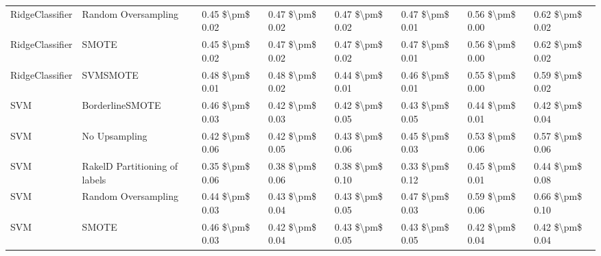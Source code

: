 \begin{tabular}{llllllll}
                RidgeClassifier &           Random Oversampling & 0.45 \$\textbackslash pm\$ 0.02 &           0.47 \$\textbackslash pm\$ 0.02 &       0.47 \$\textbackslash pm\$ 0.02 &        0.47 \$\textbackslash pm\$ 0.01 &                         0.56 \$\textbackslash pm\$ 0.00 &     0.62 \$\textbackslash pm\$ 0.02 \\
                RidgeClassifier &                         SMOTE & 0.45 \$\textbackslash pm\$ 0.02 &           0.47 \$\textbackslash pm\$ 0.02 &       0.47 \$\textbackslash pm\$ 0.02 &        0.47 \$\textbackslash pm\$ 0.01 &                         0.56 \$\textbackslash pm\$ 0.00 &     0.62 \$\textbackslash pm\$ 0.02 \\
                RidgeClassifier &                      SVMSMOTE & 0.48 \$\textbackslash pm\$ 0.01 &           0.48 \$\textbackslash pm\$ 0.02 &       0.44 \$\textbackslash pm\$ 0.01 &        0.46 \$\textbackslash pm\$ 0.01 &                         0.55 \$\textbackslash pm\$ 0.00 &     0.59 \$\textbackslash pm\$ 0.02 \\
                            SVM &               BorderlineSMOTE & 0.46 \$\textbackslash pm\$ 0.03 &           0.42 \$\textbackslash pm\$ 0.03 &       0.42 \$\textbackslash pm\$ 0.05 &        0.43 \$\textbackslash pm\$ 0.05 &                         0.44 \$\textbackslash pm\$ 0.01 &     0.42 \$\textbackslash pm\$ 0.04 \\
                            SVM &                 No Upsampling & 0.42 \$\textbackslash pm\$ 0.06 &           0.42 \$\textbackslash pm\$ 0.05 &       0.43 \$\textbackslash pm\$ 0.06 &        0.45 \$\textbackslash pm\$ 0.03 &                         0.53 \$\textbackslash pm\$ 0.06 &     0.57 \$\textbackslash pm\$ 0.06 \\
                            SVM & RakelD Partitioning of labels & 0.35 \$\textbackslash pm\$ 0.06 &           0.38 \$\textbackslash pm\$ 0.06 &       0.38 \$\textbackslash pm\$ 0.10 &        0.33 \$\textbackslash pm\$ 0.12 &                         0.45 \$\textbackslash pm\$ 0.01 &     0.44 \$\textbackslash pm\$ 0.08 \\
                            SVM &           Random Oversampling & 0.44 \$\textbackslash pm\$ 0.03 &           0.43 \$\textbackslash pm\$ 0.04 &       0.43 \$\textbackslash pm\$ 0.05 &        0.47 \$\textbackslash pm\$ 0.03 &                         0.59 \$\textbackslash pm\$ 0.06 &     0.66 \$\textbackslash pm\$ 0.10 \\
                            SVM &                         SMOTE & 0.46 \$\textbackslash pm\$ 0.03 &           0.42 \$\textbackslash pm\$ 0.04 &       0.43 \$\textbackslash pm\$ 0.05 &        0.43 \$\textbackslash pm\$ 0.05 &                         0.42 \$\textbackslash pm\$ 0.04 &     0.42 \$\textbackslash pm\$ 0.04 \\

\end{tabular}
